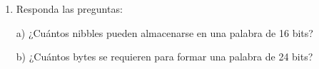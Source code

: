 \documentclass[a4paper, 12pt]{article}
\newcommand{\Aspace}{0.2cm}
\begin{document}
\begin{enumerate}
        \item Responda las preguntas:
            \vspace{\Aspace} \par
            a) ¿Cuántos nibbles pueden almacenarse en una palabra de 16 bits?
            \\ { \color{azul}  }

            \vspace{\Aspace} \par
            b) ¿Cuántos bytes se requieren para formar una palabra de 24 bits?
            \\ { \color{azul}  }
    \end{enumerate}
\end{document}
